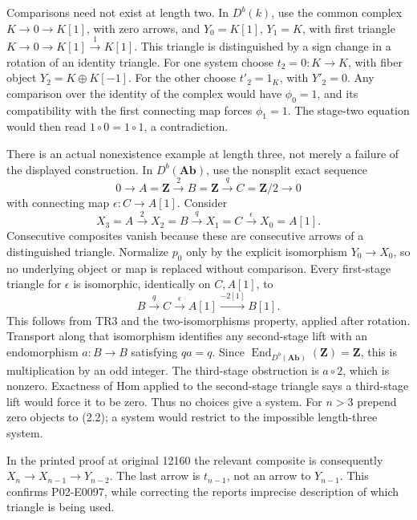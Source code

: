 Comparisons need not exist at length two. In \(D^b(k)\),\allowbreak{} use the common complex \(K\to0\to K[1]\),\allowbreak{} with zero arrows,\allowbreak{} and \(Y_0=K[1]\),\allowbreak{} \(Y_1=K\),\allowbreak{} with first triangle \(K\to0\to K[1]\xrightarrow{1}K[1]\). This triangle is distinguished by a sign change in a rotation of an identity triangle. For one system choose \(t_2=0:K\to K\),\allowbreak{} with fiber object \(Y_2=K\oplus K[-1]\). For the other choose \(t'_2=1_K\),\allowbreak{} with \(Y'_2=0\). Any comparison over the identity of the complex would have \(\phi_0=1\),\allowbreak{} and its compatibility with the first connecting map forces \(\phi_1=1\). The stage-two equation would then read \(1\circ0=1\circ1\),\allowbreak{} a contradiction.

There is an actual nonexistence example at length three,\allowbreak{} not merely a failure of the displayed construction. In \(D^b(\mathbf{Ab})\),\allowbreak{} use the nonsplit exact sequence \[
0\to A=\mathbf Z\xrightarrow{2}B=\mathbf Z
 \xrightarrow{q}C=\mathbf Z/2\to0
\] with connecting map \(\epsilon:C\to A[1]\). Consider \[
X_3=A\xrightarrow{2}X_2=B\xrightarrow{q}X_1=C
 \xrightarrow{\epsilon}X_0=A[1]. \tag{2.2}
\] Consecutive composites vanish because these are consecutive arrows of a distinguished triangle. Normalize \(p_0\) only by the explicit isomorphism \(Y_0\to X_0\),\allowbreak{} so no underlying object or map is replaced without comparison. Every first-stage triangle for \(\epsilon\) is isomorphic,\allowbreak{} identically on \(C,A[1]\),\allowbreak{} to \[
B\xrightarrow{q}C\xrightarrow{\epsilon}A[1]
 \xrightarrow{-2[1]}B[1].
\] This follows from TR3 and the two-isomorphisms property,\allowbreak{} applied after rotation. Transport along that isomorphism identifies any second-stage lift with an endomorphism \(a:B\to B\) satisfying \(qa=q\). Since \(\operatorname{End}_{D^b(\mathbf{Ab})}(\mathbf Z)=\mathbf Z\),\allowbreak{} this is multiplication by an odd integer. The third-stage obstruction is \(a\circ2\),\allowbreak{} which is nonzero. Exactness of Hom applied to the second-stage triangle says a third-stage lift would force it to be zero. Thus no choices give a system. For \(n>3\) prepend zero objects to (2.2)\allowbreak{}; a system would restrict to the impossible length-three system.

In the printed proof at original 12160 the relevant composite is consequently \(X_n\to X_{n-1}\to Y_{n-2}\). The last arrow is \(t_{n-1}\),\allowbreak{} not an arrow to \(Y_{n-1}\). This confirms P02-E0097,\allowbreak{} while correcting the report\textquotesingle s imprecise description of which triangle is being used.


